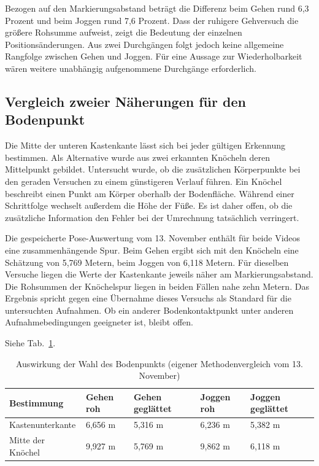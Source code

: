 Bezogen auf den Markierungsabstand beträgt die Differenz beim Gehen rund 6,3 Prozent und beim Joggen rund 7,6 Prozent. Dass der ruhigere Gehversuch die größere Rohsumme aufweist, zeigt die Bedeutung der einzelnen Positionsänderungen. Aus zwei Durchgängen folgt jedoch keine allgemeine Rangfolge zwischen Gehen und Joggen. Für eine Aussage zur Wiederholbarkeit wären weitere unabhängig aufgenommene Durchgänge erforderlich.

\subsection{Vergleich zweier Näherungen für den Bodenpunkt}
Die Mitte der unteren Kastenkante lässt sich bei jeder gültigen Erkennung bestimmen. Als Alternative wurde aus zwei erkannten Knöcheln deren Mittelpunkt gebildet. Untersucht wurde, ob die zusätzlichen Körperpunkte bei den geraden Versuchen zu einem günstigeren Verlauf führen. Ein Knöchel beschreibt einen Punkt am Körper oberhalb der Bodenfläche. Während einer Schrittfolge wechselt außerdem die Höhe der Füße. Es ist daher offen, ob die zusätzliche Information den Fehler bei der Umrechnung tatsächlich verringert.

Die gespeicherte Pose-Auswertung vom 13. November enthält für beide Videos eine zusammenhängende Spur. Beim Gehen ergibt sich mit den Knöcheln eine Schätzung von 5,769 Metern, beim Joggen von 6,118 Metern. Für dieselben Versuche liegen die Werte der Kastenkante jeweils näher am Markierungsabstand. Die Rohsummen der Knöchelspur liegen in beiden Fällen nahe zehn Metern. Das Ergebnis spricht gegen eine Übernahme dieses Versuchs als Standard für die untersuchten Aufnahmen. Ob ein anderer Bodenkontaktpunkt unter anderen Aufnahmebedingungen geeigneter ist, bleibt offen.

Siehe Tab.~\ref{tab:em-pose}.
\begin{table}[htbp]\centering\caption{Auswirkung der Wahl des Bodenpunkts (eigener Methodenvergleich vom 13. November)}\label{tab:em-pose}
\begin{tabular}{@{}lllll@{}}\toprule Bestimmung & Gehen roh & Gehen geglättet & Joggen roh & Joggen geglättet\\\midrule
Kastenunterkante & 6,656 m & 5,316 m & 6,236 m & 5,382 m\\
Mitte der Knöchel & 9,927 m & 5,769 m & 9,862 m & 6,118 m\\\bottomrule\end{tabular}\end{table}


